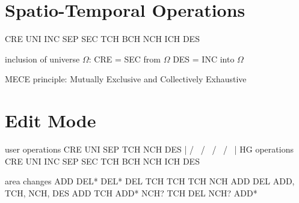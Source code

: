\section{Spatio-Temporal Operations} %
\label{sec:spatio_temporal_operations}

CRE
UNI
INC
SEP
SEC
TCH
BCH
NCH
ICH
DES



inclusion of universe $\Omega$:
CRE = SEC from $\Omega$
DES = INC into $\Omega$

MECE principle: Mutually Exclusive and Collectively Exhaustive


\section{Edit Mode} %
\label{sec:edit_mode}


user operations     CRE     UNI          SEP         TCH         NCH      DES
                     |      / \         /   \        /  \       /   \      |
HG operations       CRE   UNI   INC   SEP   SEC   TCH   BCH   NCH   ICH   DES

area changes        ADD   DEL*  DEL*  DEL   TCH   TCH   TCH   NCH   ADD   DEL
ADD, TCH, NCH, DES        ADD   TCH   ADD*  NCH?        TCH         DEL
                                NCH?        ADD*





